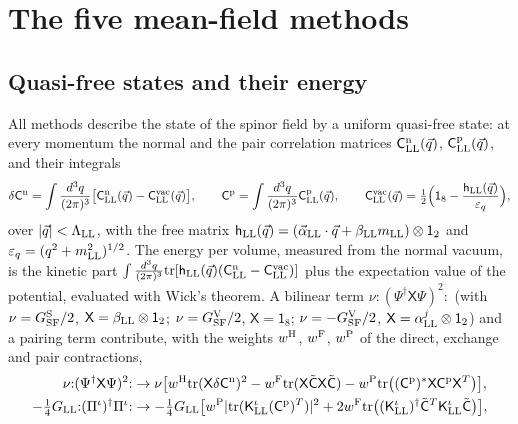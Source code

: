 \documentclass[aps,prd,onecolumn,superscriptaddress,nofootinbib,floatfix,longbibliography]{revtex4-2}
\newcommand{\LL}{{\rm LL}}
\newcommand{\SF}{{\rm SF}}
\newcommand{\tr}{\mathrm{tr}}
\begin{document}
\section{The five mean-field methods}
\label{sec:methods}

\subsection{Quasi-free states and their energy}

All methods describe the state of the spinor field by a uniform quasi-free state: at every momentum the normal and the pair
correlation matrices $\mathsf C^{\rm n}_\LL(\vec q)$, $\mathsf C^{\rm p}_\LL(\vec q)$, and their integrals
\begin{equation}
\delta\mathsf C^{\rm n}=\int\frac{d^3q}{(2\pi)^3}\big[\mathsf C^{\rm n}_\LL(\vec q)-\mathsf C^{\rm vac}_\LL(\vec q)\big],\qquad\mathsf C^{\rm p}=\int\frac{d^3q}{(2\pi)^3}\mathsf C^{\rm p}_\LL(\vec q),
\qquad\mathsf C^{\rm vac}_\LL(\vec q)=\tfrac12\Big(\mathsf 1_8-\frac{\mathsf h_\LL(\vec q)}{\varepsilon_q}\Big),
\label{eq:localC}
\end{equation}
over $|\vec q|<\Lambda_\LL$, with the free matrix $\mathsf h_\LL(\vec q)=(\vec\alpha_\LL\cdot\vec q+\beta_\LL m_\LL)\otimes\mathsf 1_2$ and
$\varepsilon_q=(q^2+m_\LL^2)^{1/2}$. The energy per volume, measured from the normal vacuum, is the kinetic part
$\int\frac{d^3q}{(2\pi)^3}\tr[\mathsf h_\LL(\vec q)(\mathsf C^{\rm n}_\LL-\mathsf C^{\rm vac}_\LL)]$ plus the expectation value of the potential,
evaluated with Wick's theorem. A bilinear term $\nu{:}(\Psi^\dagger\mathsf X\Psi)^2{:}$ (with $\nu=G^{\rm S}_\SF/2$, $\mathsf X=\beta_\LL\otimes\mathsf 1_2$;
$\nu=G^{\rm V}_\SF/2$, $\mathsf X=\mathsf 1_8$; $\nu=-G^{\rm V}_\SF/2$, $\mathsf X=\alpha^j_\LL\otimes\mathsf 1_2$) and a pairing term contribute,
with the weights $w^{\rm H}$, $w^{\rm F}$, $w^{\rm P}$ of the direct, exchange and pair contractions,
\begin{align}
\nu{:}(\Psi^\dagger\mathsf X\Psi)^2{:}&\to\nu\big[w^{\rm H}\tr(\mathsf X\delta\mathsf C^{\rm n})^2-w^{\rm F}\tr(\mathsf X\tilde{\mathsf C}\mathsf X\tilde{\mathsf C})-w^{\rm P}\tr\big((\mathsf C^{\rm p})^*\mathsf X\mathsf C^{\rm p}\mathsf X^T\big)\big],\label{eq:Ebil}\\
-\tfrac14G_\LL{:}(\Pi^\iota)^\dagger\Pi^\iota{:}&\to-\tfrac14G_\LL\big[w^{\rm P}|\tr(\mathsf K^\iota_\LL(\mathsf C^{\rm p})^T)|^2+2w^{\rm F}\tr\big((\mathsf K^\iota_\LL)^\dagger\tilde{\mathsf C}^T\mathsf K^\iota_\LL\tilde{\mathsf C}\big)\big],\label{eq:Epair}
\end{align}
\end{document}
